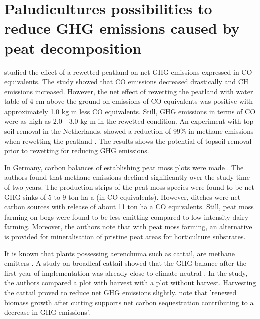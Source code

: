 {\section{Paludicultures possibilities to reduce GHG emissions caused by peat decomposition}
\citet{van2013rewetting} studied the effect of a rewetted peatland on net GHG emissions expressed in CO equivalents. The study showed that CO emissions decreased drastically and CH emissions increased. However, the net effect of rewetting the peatland with water table of 4 cm above the ground on emissions of CO equivalents was positive with approximately 1.0 kg m less CO equivalents. Still, GHG emissions in terms of CO were as high as 2.0 - 3.0 kg m in the rewetted condition. An experiment with top soil removal in the Netherlands, showed a reduction of 99\% in methane emissions when rewetting the peatland \citep{harpenslager2015rewetting}. The results shows the potential of topsoil removal prior to rewetting for reducing GHG emissions. 

In Germany, carbon balances of establishing peat moss plots were made \citep{gunther2017greenhouse}. The authors found that methane emissions declined significantly over the study time of two years. The production strips of the peat moss  species were found to be net GHG sinks of 5 to 9 ton ha a (in CO equivalents). However, ditches were net carbon sources with release of about 11 ton ha a CO equivalents. Still, peat moss farming on bogs were found to be less emitting compared to low-intensity dairy farming. Moreover, the authors note that with peat moss farming, an alternative is provided for mineralisation of pristine peat areas for horticulture substrates.
 
It is known that plants possessing aerenchuma such as cattail, are methane emitters \citep{wichtmann2016paludiculture}. A study on broadleaf cattail showed that the GHG balance after the first year of implementation was already close to climate neutral \citep{guntherghgtypha}. In the study, the authors compared a plot with harvest with a plot without harvest. Harvesting the cattail proved to reduce net GHG emissions slightly. \citet{wichtmann2016paludiculture} note that 'renewed biomass growth after cutting supports net carbon sequestration contributing to a decrease in GHG emissions'. 

}

